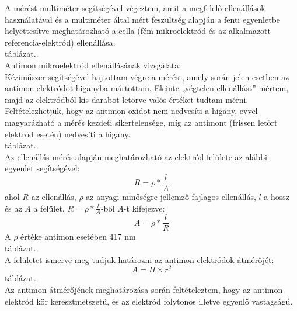 A mérést multiméter segítségével végeztem, amit a megfelelő ellenállások használatával és a multiméter által mért feszültség alapján a fenti egyenletbe helyettesítve meghatározható a cella (fém     mikroelektród és az alkalmazott referencia-elektród) ellenállása. \\
táblázat..\\
Antimon mikroelektród ellenállásának vizsgálata:\\
Kéziműszer segítségével hajtottam végre a mérést, amely során jelen esetben az antimon-elektródot higanyba mártottam. Eleinte „végtelen ellenállást” mértem, majd az elektródból kis darabot letörve valós értéket tudtam mérni. Feltételezhetjük, hogy az antimon-oxidot nem nedvesíti a higany, evvel magyarázható a mérés kezdeti sikertelensége, míg az antimont (frissen letört elektród esetén) nedvesíti a higany.\\
táblázat..\\
Az ellenállás mérés alapján meghatározható az elektród felülete az alábbi egyenlet segítségével: \\
\begin{equation}
R = \rho * \frac{l}{A}
\end{equation}
ahol $R$ az ellenállás, $\rho$ az anyagi minőségre jellemző fajlagos ellenállás, $l$ a hossz és az $A$ a felület. $R = \rho * \frac{l}{A}$-ből $A$-t kifejezve:
\begin{equation}
A = \rho * \frac{l}{R}
\end{equation}
A $\rho$ értéke antimon esetében 417 n\Omega m\\
táblázat..\\
A felületet ismerve meg tudjuk határozni az antimon-elektródok átmérőjét: \\
\begin{equation}
A = \Pi \times r^2
\end{equation}
táblázat..\\
Az antimon átmérőjének meghatározása során feltételeztem, hogy az antimon elektród kör keresztmetszetű, és az elektród folytonos illetve egyenlő vastagságú.

